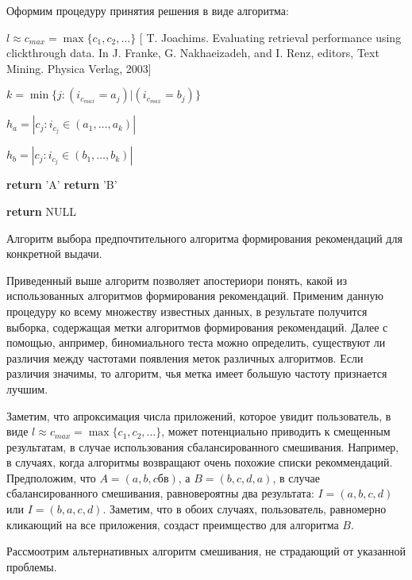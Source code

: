 \documentclass[12pt,a4paper]{report}
\begin{document}
Оформим процедуру принятия решения в виде алгоритма:


\begin{algorithm}[H]
\SetAlgoLined
{}
$l \approx c_{max} = \max\{c_1,c_2,\dots\}$ [ T. Joachims. Evaluating retrieval performance using clickthrough data. In J. Franke, G. Nakhaeizadeh, and I. Renz, editors, Text Mining. Physica Verlag, 2003]

$k = \min\{j: (i_{c_{max}} = a_j) | (i_{c_{max}} = b_j)\}$

$h_a = |{c_j: i_{c_j} \in (a_1, \dots, a_k)}|$

$h_b = |{c_j: i_{c_j} \in (b_1, \dots, b_k)}|$

 {
\textbf{return} 'A'
}
 {
\textbf{return} 'B'
}

\textbf{return} NULL

\caption{Алгоритм выбора предпочтительного алгоритма формирования рекомендаций для конкретной выдачи.}
\label{alg:CBI}
\end{algorithm}

Приведенный выше алгоритм позволяет апостериори понять, какой из использованных алгоритмов формирования рекомендаций.
Применим данную процедуру ко всему множеству известных данных, в результате получится выборка, содержащая метки алгоритмов формирования рекомендаций. Далее с помощью, анпример, биномиального теста можно определить, существуют ли различия между частотами появления меток различных алгоритмов. Если различия значимы, то алгоритм, чья метка имеет большую частоту признается лучшим.

Заметим, что апроксимация числа приложений, которое увидит пользователь, в виде $l \approx c_{max} = \max\{c_1,c_2,\dots\}$, может потенциально приводить к смещенным результатам, в случае использования сбалансированного смешивания. Например, в случаях, когда алгоритмы возвращают очень похожие списки рекоммендаций. Предположим, что $A = (a, b, cб в)$, а $B = (b, c, d, a)$, в случае сбалансированного смешивания, равновероятны два результата: $I=(a, b, c, d)$ или $I=(b, a, c, d)$. Заметим, что в обоих случаях, пользователь, равномерно кликающий на все приложения, создаст преимщество для алгоритма $B$.

Рассмоотрим альтернативных алгоритм смешивания, не страдающий от указанной проблемы.
\end{document}
